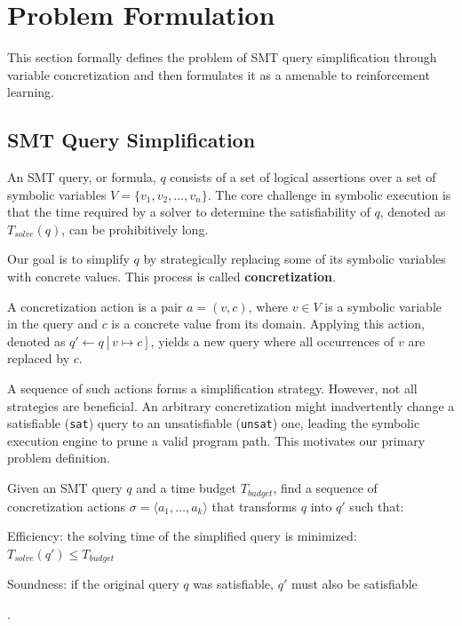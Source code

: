 \section{Problem Formulation}
\label{sec:formalize}

This section formally defines the problem of SMT query simplification through variable concretization and then formulates it as a \MDP{} amenable to reinforcement learning.

\subsection{SMT Query Simplification}

An SMT query, or formula, $q$ consists of a set of logical assertions over a set of symbolic variables $V = \{v_1, v_2, \dots, v_n\}$. The core challenge in symbolic execution is that the time required by a solver to determine the satisfiability of $q$, denoted as $T_{solve}(q)$, can be prohibitively long.

Our goal is to simplify $q$ by strategically replacing some of its symbolic variables with concrete values. This process is called \textbf{concretization}.

\begin{definition}
A concretization action is a pair $a = (v, c)$, where $v \in V$ is a symbolic variable in the query and $c$ is a concrete value from its domain. Applying this action, denoted as $q' \leftarrow q[v \mapsto c]$, yields a new query where all occurrences of $v$ are replaced by $c$.
\end{definition}

A sequence of such actions forms a simplification strategy. However, not all strategies are beneficial. An arbitrary concretization might inadvertently change a satisfiable (\texttt{sat}) query to an unsatisfiable (\texttt{unsat}) one, leading the symbolic execution engine to prune a valid program path. This motivates our primary problem definition.

\begin{problem}
\label{problem:optimal-simplification}
Given an SMT query $q$ and a time budget $T_{budget}$, find a sequence of concretization actions $\sigma = \langle a_1, \dots, a_k \rangle$ that transforms $q$ into $q'$ such that:
\begin{enumerate*}[label=(\roman*), itemjoin={{; }}, itemjoin*={{; and }}]
    \item Efficiency: the solving time of the simplified query is minimized: $T_{solve}(q') \le T_{budget}$
    \item Soundness: if the original query $q$ was satisfiable, $q'$ must also be satisfiable
\end{enumerate*}.
\end{problem}

